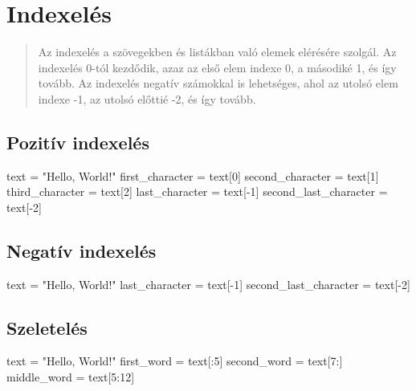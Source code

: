 \section{Indexelés}

\begin{quote}
    Az indexelés a szövegekben és listákban való elemek elérésére szolgál.
Az indexelés 0-tól kezdődik, azaz az első elem indexe 0, a másodiké 1, és így tovább.
Az indexelés negatív számokkal is lehetséges, ahol az utolsó elem indexe -1, az utolsó előttié -2, és így tovább.
\end{quote}

\subsection{Pozitív indexelés}
\begin{pycode}
    text = "Hello, World!"
    first_character = text[0]
    second_character = text[1]
    third_character = text[2]
    last_character = text[-1]
    second_last_character = text[-2]
\end{pycode}

\subsection{Negatív indexelés}
\begin{pycode}
    text = "Hello, World!"
    last_character = text[-1]
    second_last_character = text[-2]
\end{pycode}

\subsection{Szeletelés}
\begin{pycode}
    text = "Hello, World!"
    first_word = text[:5]
    second_word = text[7:]
    middle_word = text[5:12]
\end{pycode}